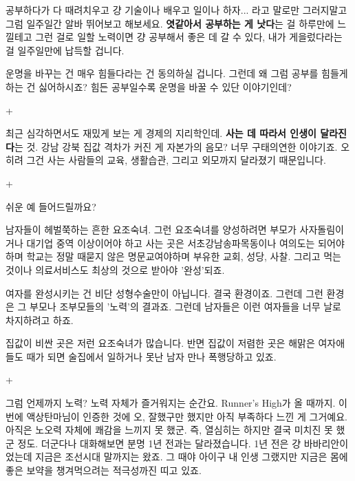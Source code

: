 공부하다가 다 때려치우고 걍 기술이나 배우고 일이나 하자... 라고 말로만 그러지말고
그럼 일주일간 알바 뛰어보고 해보세요. \textbf{엿같아서 공부하는 게 낫다}는 걸 하루만에 느낄테고
그런 걸로 일할 노력이면 걍 공부해서 좋은 데 갈 수 있다, 내가 게을렀다라는 걸 일주일만에 납득할 겁니다.
\vspace{5mm}

운명을 바꾸는 건 매우 힘들다라는 건 동의하실 겁니다.
그런데 왜 그럼 공부를 힘들게 하는 건 싫어하시죠?
힘든 공부일수록 운명을 바꿀 수 있단 이야기인데?
\vspace{5mm}

+
\vspace{5mm}

최근 심각하면서도 재밌게 보는 게 경제의 지리학인데.
\textbf{사는 데 따라서 인생이 달라진다}는 것.
강남 강북 집값 격차가 커진 게 자본가의 음모?
너무 구태의연한 이야기죠. 오히려 그건 사는 사람들의 교육, 생활습관, 그리고 외모까지 달라졌기 때문입니다.
\vspace{5mm}

+
\vspace{5mm}

쉬운 예 들어드릴까요?
\vspace{5mm}

남자들이 헤벌쭉하는 흔한 요조숙녀.
그런 요조숙녀를 양성하려면 부모가 사자돌림이거나 대기업 중역 이상이어야 하고
사는 곳은 서초강남송파목동이나 여의도는 되어야 하며
학교는 정말 때묻지 않은 명문교여야하며
부유한 교회, 성당, 사찰. 그리고 먹는 것이나 의료서비스도 최상의 것으로 받아야 '완성'되죠.
\vspace{5mm}

여자를 완성시키는 건 비단 성형수술만이 아닙니다. 결국 환경이죠.
그런데 그런 환경은 그 부모나 조부모들의 '노력'의 결과죠.
그런데 남자들은 이런 여자들을 너무 날로 차지하려고 하죠.
\vspace{5mm}

집값이 비싼 곳은 저런 요조숙녀가 많습니다.
반면 집값이 저렴한 곳은 해맑은 여자애들도 때가 되면 술집에서 일하거나 못난 남자 만나 폭행당하고 있죠.
\vspace{5mm}

+
\vspace{5mm}

그럼 언제까지 노력?
노력 자체가 즐거워지는 순간요. Runner's High가 올 때까지.
이번에 액상탄마님이 인증한 것에 오, 잘했구만 했지만 아직 부족하다 느낀 게 그거예요.
아직은 노오력 자체에 쾌감을 느끼지 못 했군. 즉, 열심히는 하지만 결국 미치진 못 했군 정도.
더군다나 대화해보면 분명 1년 전과는 달라졌습니다.
1년 전은 걍 바바리안이었는데 지금은 조선시대 말까지는 왔죠.
그 때야 아이구 내 인생 그랬지만 지금은 몸에 좋은 보약을 챙겨먹으려는 적극성까진 띠고 있죠.
\vspace{5mm}

